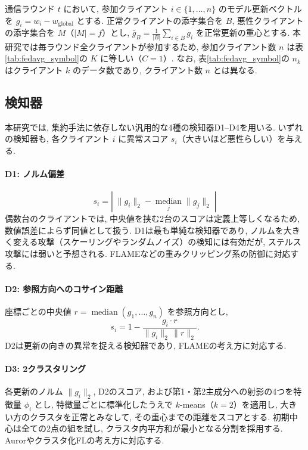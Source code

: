 \documentclass[a4j, twocolumn, dvipdfmx]{jsarticle}
\begin{document}
通信ラウンド $t$ において, 参加クライアント $i \in \{1,\dots,n\}$ のモデル更新ベクトルを $g_i = w_i - w_{\text{global}}$ とする. 正常クライアントの添字集合を $B$, 悪性クライアントの添字集合を $M$（$|M| = f$）とし, $\bar{g}_B = \frac{1}{|B|}\sum_{i \in B} g_i$ を正常更新の重心とする. 本研究では毎ラウンド全クライアントが参加するため, 参加クライアント数 $n$ は表\ref{tab:fedavg_symbol}の $K$ に等しい（$C=1$）. なお, 表\ref{tab:fedavg_symbol}の $n_k$ はクライアント $k$ のデータ数であり, クライアント数 $n$ とは異なる.

\subsection{検知器}
\label{sec:detectors}

本研究では, 集約手法に依存しない汎用的な4種の検知器D1--D4を用いる. いずれの検知器も, 各クライアント $i$ に異常スコア $s_i$（大きいほど悪性らしい）を与える.

\paragraph{D1: ノルム偏差}
\begin{equation}
s_i = \left|\; \|g_i\|_2 - \operatorname*{median}_{j}\|g_j\|_2 \;\right|
\end{equation}
偶数台のクライアントでは, 中央値を挟む2台のスコアは定義上等しくなるため, 数値誤差によらず同値として扱う. D1は最も単純な検知器であり, ノルムを大きく変える攻撃（スケーリングやランダムノイズ）の検知には有効だが, ステルス攻撃には弱いと予想される. FLAME\cite{nguyen2022flame}などの重みクリッピング系の防御に対応する.

\paragraph{D2: 参照方向へのコサイン距離}
座標ごとの中央値 $r = \operatorname{median}(g_1,\dots,g_n)$ を参照方向とし,
\begin{equation}
s_i = 1 - \frac{g_i \cdot r}{\|g_i\|_2\,\|r\|_2}.
\end{equation}
D2は更新の向きの異常を捉える検知器であり, FLAME\cite{nguyen2022flame}の考え方に対応する.

\paragraph{D3: 2クラスタリング}
各更新のノルム $\|g_i\|_2$, D2のスコア, および第1・第2主成分への射影の4つを特徴量 $\phi_i$ とし, 特徴量ごとに標準化したうえで $k$-means（$k=2$）を適用し, 大きい方のクラスタを正常とみなして, その重心までの距離をスコアとする. 初期中心は全ての2点の組を試し, クラスタ内平方和が最小となる分割を採用する. Auror\cite{shen2016auror}やクラスタ化FL\cite{sattler2020byzantine}の考え方に対応する.
\end{document}
